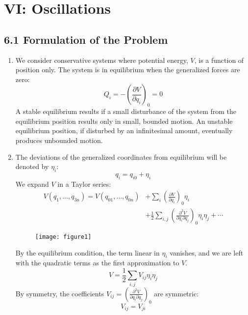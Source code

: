 \documentclass[12pt]{article}
\begin{document}
	
	\section*{VI: Oscillations}
	
	\subsection*{6.1 Formulation of the Problem}
	
	\begin{enumerate}
		\item We consider conservative systems where potential energy, $V$, is a function of position only. The system is in equilibrium when the generalized forces are zero:
		\[
		Q_i = -\left(\frac{\partial V}{\partial q_i}\right)_0 = 0
		\]
		A stable equilibrium results if a small disturbance of the system from the equilibrium position results only in small, bounded motion. An unstable equilibrium position, if disturbed by an infinitesimal amount, eventually produces unbounded motion.
		
		\item The deviations of the generalized coordinates from equilibrium will be denoted by $\eta_i$:
		\[
		q_i = q_{i0} + \eta_i
		\]
		We expand $V$ in a Taylor series:
		\begin{align*}
			V(q_1, \dots, q_{3n}) = V(q_{01}, \dots, q_{0n}) &+ \sum_i \left(\frac{\partial V}{\partial q_i}\right)_0 \eta_i \\
			&+ \frac{1}{2} \sum_{i,j} \left(\frac{\partial^2 V}{\partial q_i \partial q_j}\right)_0 \eta_i \eta_j + \cdots
		\end{align*}
		
		\begin{figure}[h]
			\centering
			\texttt{[image: figure1]}
			\caption{}
			\label{fig:figure1}
		\end{figure}
		
		By the equilibrium condition, the term linear in $\eta_i$ vanishes, and we are left with the quadratic terms as the first approximation to $V$.
		\[
		V = \frac{1}{2} \sum_{i,j} V_{ij} \eta_i \eta_j
		\]
		By symmetry, the coefficients $V_{ij} = \left(\frac{\partial^2 V}{\partial q_i \partial q_j}\right)_0$ are symmetric:
		\[
		V_{ij} = V_{ji}
		\]
		

\end{enumerate}
\end{document}
